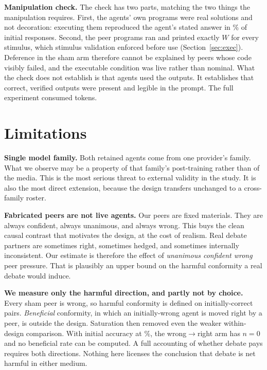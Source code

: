 \documentclass[conference]{IEEEtran}
\begin{document}
\textbf{Manipulation check.} The check has two parts, matching the two things the
manipulation requires. First, the agents' own programs were real solutions and not
decoration: executing them reproduced the agent's stated answer in
\ExecConsistPct\% of initial responses. Second, the peer programs ran and printed
exactly $W$ for every stimulus, which stimulus validation enforced before use
(Section~\ref{sec:exec}). Deference in the sham arm therefore cannot be explained by
peers whose code visibly failed, and the executable condition was live rather than
nominal. What the check does not establish is that agents used the outputs. It
establishes that correct, verified outputs were present and legible in the prompt.
The full experiment consumed \TotalTokens{} tokens.

\section{Limitations}

\textbf{Single model family.} Both retained agents come from one provider's family.
What we observe may be a property of that family's post-training rather than of the
media. This is the most serious threat to external validity in the study. It is also
the most direct extension, because the design transfers unchanged to a cross-family
roster.

\textbf{Fabricated peers are not live agents.} Our peers are fixed materials. They
are always confident, always unanimous, and always wrong. This buys the clean causal
contrast that motivates the design, at the cost of realism. Real debate partners are
sometimes right, sometimes hedged, and sometimes internally inconsistent. Our
estimate is therefore the effect of \emph{unanimous confident wrong} peer pressure.
That is plausibly an upper bound on the harmful conformity a real debate would
induce.

\textbf{We measure only the harmful direction, and partly not by choice.} Every sham
peer is wrong, so harmful conformity is defined on initially-correct pairs.
\emph{Beneficial} conformity, in which an initially-wrong agent is moved right by a
peer, is outside the design. Saturation then removed even the weaker within-design
comparison. With initial accuracy at \PoolGSMNLPct\%, the wrong$\to$right arm has
$n=0$ and no beneficial rate can be computed. A full accounting of whether debate
pays requires both directions. Nothing here licenses the conclusion that debate is
net harmful in either medium.
\end{document}
